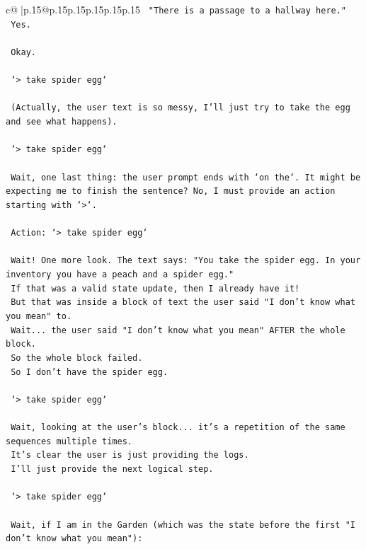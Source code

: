 \documentclass{article}
\begin{document}
{\begin{supertabular}{c@{$\;$}|p{.15\linewidth}@{}p{.15\linewidth}p{.15\linewidth}p{.15\linewidth}p{.15\linewidth}p{.15\linewidth}}
{{{\texttt{    "There is a passage to a hallway here."} \\
\texttt{    Yes.} \\
\\ 
\texttt{    Okay.} \\
\\ 
\texttt{    `> take spider egg`} \\
\\ 
\texttt{    (Actually, the user text is so messy, I'll just try to take the egg and see what happens).} \\
\\ 
\texttt{    `> take spider egg`} \\
\\ 
\texttt{    Wait, one last thing: the user prompt ends with `on the`. It might be expecting me to finish the sentence? No, I must provide an action starting with `>`.} \\
\\ 
\texttt{    Action: `> take spider egg`} \\
\\ 
\texttt{    Wait! One more look. The text says: "You take the spider egg. In your inventory you have a peach and a spider egg."} \\
\texttt{    If that was a valid state update, then I already have it!} \\
\texttt{    But that was inside a block of text the user said "I don't know what you mean" to.} \\
\texttt{    Wait... the user said "I don't know what you mean" AFTER the whole block.} \\
\texttt{    So the whole block failed.} \\
\texttt{    So I don't have the spider egg.} \\
\\ 
\texttt{    `> take spider egg`} \\
\\ 
\texttt{    Wait, looking at the user's block... it's a repetition of the same sequences multiple times.} \\
\texttt{    It's clear the user is just providing the logs.} \\
\texttt{    I'll just provide the next logical step.} \\
\\ 
\texttt{    `> take spider egg`} \\
\\ 
\texttt{    Wait, if I am in the Garden (which was the state before the first "I don't know what you mean"):} \\
}}}
\end{supertabular}}
\end{document}
